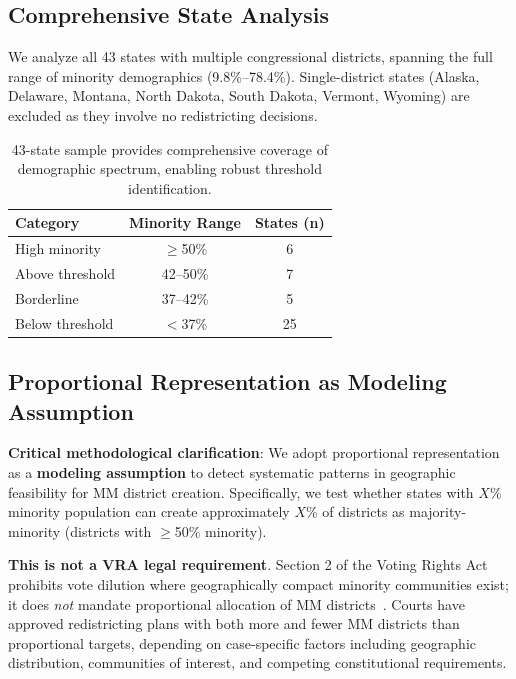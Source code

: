 \subsection{Comprehensive State Analysis}

We analyze all 43 states with multiple congressional districts, spanning the full range of minority demographics (9.8\%--78.4\%). Single-district states (Alaska, Delaware, Montana, North Dakota, South Dakota, Vermont, Wyoming) are excluded as they involve no redistricting decisions.

\begin{table}[h]
\centering
\begin{tabular}{lcc}
\toprule
\textbf{Category} & \textbf{Minority Range} & \textbf{States (n)} \\
\midrule
High minority    & $\geq$50\% & 6 \\
Above threshold  & 42--50\%   & 7 \\
Borderline       & 37--42\%   & 5 \\
Below threshold  & $<$37\%    & 25 \\
\bottomrule
\end{tabular}
\caption{43-state sample provides comprehensive coverage of demographic spectrum, enabling robust threshold identification.}
\end{table}

\subsection{Proportional Representation as Modeling Assumption}

\textbf{Critical methodological clarification}: We adopt proportional representation as a \textbf{modeling assumption} to detect systematic patterns in geographic feasibility for MM district creation. Specifically, we test whether states with $X$\% minority population can create approximately $X$\% of districts as majority-minority (districts with $\geq$50\% minority).

\textbf{This is not a VRA legal requirement}. Section 2 of the Voting Rights Act prohibits vote dilution where geographically compact minority communities exist; it does \emph{not} mandate proportional allocation of MM districts~\citep{johnson1996}. Courts have approved redistricting plans with both more and fewer MM districts than proportional targets, depending on case-specific factors including geographic distribution, communities of interest, and competing constitutional requirements.

